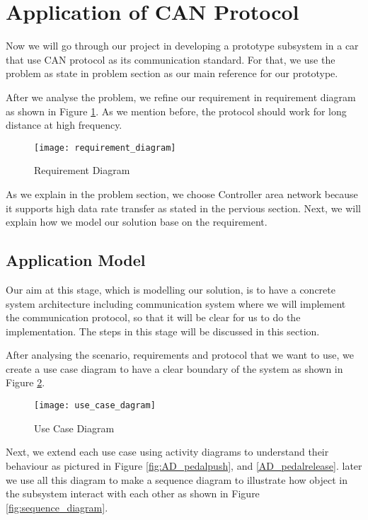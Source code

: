 
\section{Application of CAN Protocol}

Now we will go through our project in  developing a prototype subsystem in a car that use CAN protocol as its communication standard.  For that, we use the problem as state in problem section as our main  reference for our prototype.

After we analyse the problem, we refine our requirement in requirement diagram as shown in Figure \ref{fig:requirement_diagram}. As we mention before, the protocol should work for long distance at high frequency. 

\begin{figure}[h]
    \centering
    \texttt{[image: requirement\_diagram]}
    \caption{Requirement Diagram}
    \label{fig:requirement_diagram}
\end{figure}

As we explain in the problem section, we choose Controller area network because it supports high data rate transfer as stated in the pervious section. Next, we will explain how we model our solution base on the requirement.

\subsection{Application Model}

Our aim at this stage, which is modelling our solution, is to have a concrete system architecture including communication system where we will implement the communication protocol, so that it will be clear for us to do the implementation. The steps in this stage will be discussed in this section.

After analysing the scenario, requirements and protocol that we want to use, we create a use case diagram to have a clear boundary of the system as shown in Figure \ref{fig:use_case_dagram}.

\begin{figure}[h]
    \centering
    \texttt{[image: use\_case\_dagram]}
    \caption{Use Case Diagram}
    \label{fig:use_case_dagram}
\end{figure}

Next, we extend each use case using activity diagrams to understand their behaviour as pictured in Figure \ref{fig:AD_pedalpush}, and \ref{AD_pedalrelease}. later we use all this diagram to make a sequence diagram to illustrate how object in the subsystem interact with each other as shown in Figure \ref{fig:sequence_diagram}.

